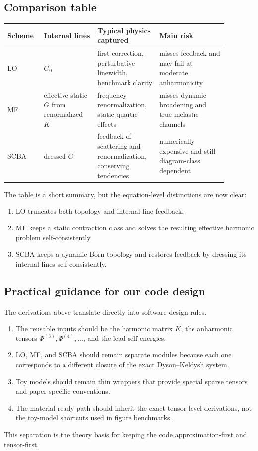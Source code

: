 \subsection{Comparison table}
\begin{center}
\begin{longtable}{p{0.14\linewidth}p{0.22\linewidth}p{0.24\linewidth}p{0.28\linewidth}}
\toprule
Scheme & Internal lines & Typical physics captured & Main risk \\
\midrule
LO & $G_0$ & first correction, perturbative linewidth, benchmark clarity & misses feedback and may fail at moderate anharmonicity \\
MF & effective static $G$ from renormalized $K$ & frequency renormalization, static quartic effects & misses dynamic broadening and true inelastic channels \\
SCBA & dressed $G$ & feedback of scattering and renormalization, conserving tendencies & numerically expensive and still diagram-class dependent \\
\bottomrule
\end{longtable}
\end{center}
The table is a short summary, but the equation-level distinctions are now clear:
\begin{enumerate}[label=\arabic*.]
\item LO truncates both topology and internal-line feedback.
\item MF keeps a static contraction class and solves the resulting effective harmonic problem self-consistently.
\item SCBA keeps a dynamic Born topology and restores feedback by dressing its internal lines self-consistently.
\end{enumerate}

\subsection{Practical guidance for our code design}
The derivations above translate directly into software design rules.
\begin{enumerate}[label=\arabic*.]
\item The reusable inputs should be the harmonic matrix $K$, the anharmonic tensors $\Phi^{(3)}, \Phi^{(4)}, \ldots$, and the lead self-energies.
\item LO, MF, and SCBA should remain separate modules because each one corresponds to a different closure of the exact Dyson--Keldysh system.
\item Toy models should remain thin wrappers that provide special sparse tensors and paper-specific conventions.
\item The material-ready path should inherit the exact tensor-level derivations, not the toy-model shortcuts used in figure benchmarks.
\end{enumerate}
This separation is the theory basis for keeping the code approximation-first and tensor-first.

